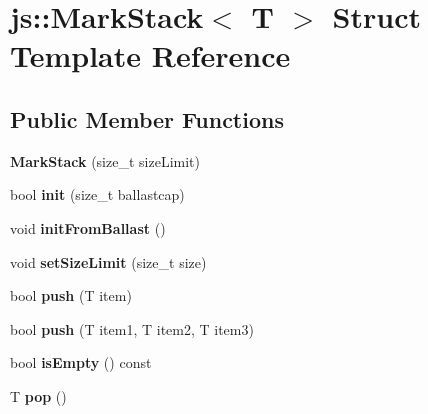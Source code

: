 \hypertarget{structjs_1_1_mark_stack}{\section{js\-:\-:Mark\-Stack$<$ T $>$ Struct Template Reference}
\label{structjs_1_1_mark_stack}
}
\subsection*{Public Member Functions}
\begin{DoxyCompactItemize}
\item 
\hypertarget{structjs_1_1_mark_stack_ae0a63c910e6728c8d3d07e0a29966a7b}{{\bfseries Mark\-Stack} (size\-\_\-t size\-Limit)}\label{structjs_1_1_mark_stack_ae0a63c910e6728c8d3d07e0a29966a7b}

\item 
\hypertarget{structjs_1_1_mark_stack_aed7dd68474502d702e24986935506cc7}{bool {\bfseries init} (size\-\_\-t ballastcap)}\label{structjs_1_1_mark_stack_aed7dd68474502d702e24986935506cc7}

\item 
\hypertarget{structjs_1_1_mark_stack_ad920d3bef00bd9ae1bfd49cef626070c}{void {\bfseries init\-From\-Ballast} ()}\label{structjs_1_1_mark_stack_ad920d3bef00bd9ae1bfd49cef626070c}

\item 
\hypertarget{structjs_1_1_mark_stack_ad8924423f212ff1a5174d0521ec78ced}{void {\bfseries set\-Size\-Limit} (size\-\_\-t size)}\label{structjs_1_1_mark_stack_ad8924423f212ff1a5174d0521ec78ced}

\item 
\hypertarget{structjs_1_1_mark_stack_a38060cf702ee4fe09c68f34eaa409f8d}{bool {\bfseries push} (T item)}\label{structjs_1_1_mark_stack_a38060cf702ee4fe09c68f34eaa409f8d}

\item 
\hypertarget{structjs_1_1_mark_stack_a0996613422ac9502d716e8774a895e76}{bool {\bfseries push} (T item1, T item2, T item3)}\label{structjs_1_1_mark_stack_a0996613422ac9502d716e8774a895e76}

\item 
\hypertarget{structjs_1_1_mark_stack_aa832b1de7d8e488e05964c3d53cabbd7}{bool {\bfseries is\-Empty} () const }\label{structjs_1_1_mark_stack_aa832b1de7d8e488e05964c3d53cabbd7}

\item 
\hypertarget{structjs_1_1_mark_stack_ab8ff9f1d2af14d9e3e78358aef9460df}{T {\bfseries pop} ()}\label{structjs_1_1_mark_stack_ab8ff9f1d2af14d9e3e78358aef9460df}


\end{DoxyCompactItemize}
